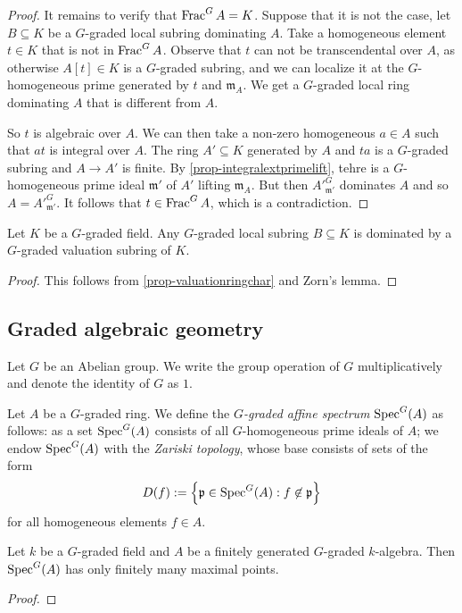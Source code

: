\begin{proof}
    It remains to verify that $\operatorname{Frac}^G A=K$. Suppose that it is not the case, let $B\subseteq K$ be a $G$-graded local subring dominating $A$. Take a homogeneous element $t\in K$ that is not in $\operatorname{Frac}^G A$. Observe that $t$ can not be transcendental over $A$, as otherwise $A[t]\in K$ is a $G$-graded subring, and we can localize it at the $G$-homogeneous prime generated by $t$ and $\mathfrak{m}_A$. We get a $G$-graded local ring dominating $A$ that is different from $A$.

    So $t$ is algebraic over $A$. We can then take a non-zero homogeneous $a\in A$ such that $at$ is integral over $A$. The ring $A'\subseteq K$ generated by $A$ and $ta$ is a $G$-graded subring and $A\rightarrow A'$ is finite. By \cref{prop-integralextprimelift}, tehre is a $G$-homogeneous prime ideal $\mathfrak{m}'$ of $A'$ lifting $\mathfrak{m}_A$. But then $A'^G_{\mathfrak{m}'}$ dominates $A$ and so $A=A'^G_{\mathfrak{m}'}$. It follows that $t\in \operatorname{Frac}^G A$, which is a contradiction.
\end{proof}

\begin{corollary}
    Let $K$ be a $G$-graded field. Any $G$-graded local subring $B\subseteq K$ is dominated by a $G$-graded valuation subring of $K$.
\end{corollary}
\begin{proof}
    This follows from \cref{prop-valuationringchar} and Zorn's lemma.
\end{proof}

\subsection{Graded algebraic geometry}
Let $G$ be an Abelian group. We write the group operation of $G$ multiplicatively and denote the identity of $G$ as $1$.

\begin{definition}
    Let $A$ be a $G$-graded ring. We define the \emph{$G$-graded affine spectrum} $\operatorname{Spec}^G(A)$ as follows: as a set $\operatorname{Spec}^G (A)$ consists of all $G$-homogeneous prime ideals of $A$; we endow $\operatorname{Spec}^G(A)$ with the \emph{Zariski topology}, whose base consists of sets of the form 
    \[
        D(f):=\left\{\mathfrak{p}\in \operatorname{Spec}^G(A): f\not\in \mathfrak{p}\right\}
    \]
    for all homogeneous elements $f\in A$.
\end{definition}

\begin{lemma}
    Let $k$ be a $G$-graded field and $A$ be a finitely generated $G$-graded $k$-algebra. Then $\operatorname{Spec}^G(A)$ has only finitely many maximal points.
\end{lemma}
\begin{proof}
    
\end{proof}

